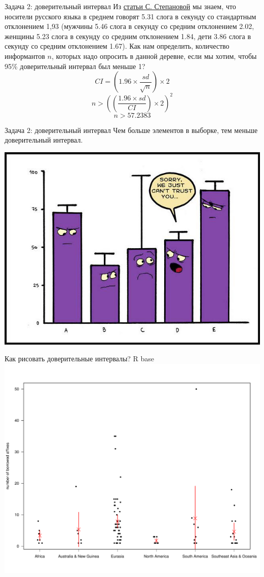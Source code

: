 \begin{frame}{Задача 2: доверительный интервал}
Из \href{https://www.internationalphoneticassociation.org/icphs-proceedings/ICPhS2011/OnlineProceedings/RegularSession/Stepanova/Stepanova.pdf}{\alert{статьи С. Степановой}} мы знаем, что носители русского языка в среднем говорят 5.31 слога в секунду со стандартным отклонением 1,93 (мужчины 5.46 слога в секунду  со средним отклонением 2.02, женщины 5.23 слога в секунду  со средним отклонением 1.84, дети 3.86 слога в секунду со средним отклонением 1.67). Как нам определить, количество информантов $n$, которых надо опросить в данной деревне, если мы хотим, чтобы 95\% доверительный интервал был меньше 1? \pause \vfill
$$CI = \left(1.96\times \frac{sd}{\sqrt{n}}\right)\times 2$$ \vfill
$$n > \left(\left(\frac{1.96\times sd}{CI}\right)\times 2\right)^2$$ \vfill
$$n > 57.2383$$
\end{frame}
\begin{frame}{Задача 2: доверительный интервал}
Чем больше элементов в выборке, тем меньше доверительный интервал. \\
\begin{center}
\includegraphics[width=0.8\linewidth]{conf.png}
\end{center}
\end{frame}
\begin{frame}{Как рисовать доверительные интервалы? R base}
\includegraphics[width=0.92\linewidth]{rbase}
\end{frame}
